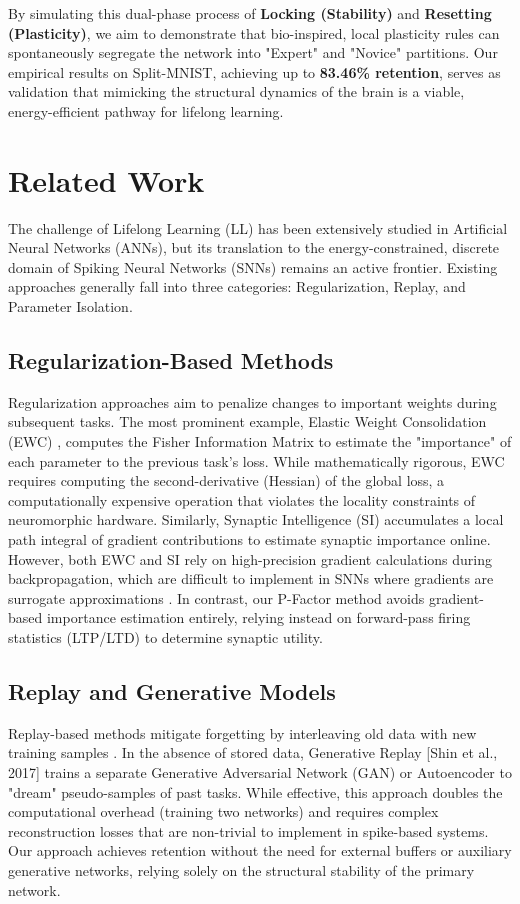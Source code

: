 \documentclass[5p,times]{elsarticle}
\begin{document}
By simulating this dual-phase process of \textbf{Locking (Stability)} and \textbf{Resetting (Plasticity)}, we aim to demonstrate that bio-inspired, local plasticity rules can spontaneously segregate the network into "Expert" and "Novice" partitions. Our empirical results on Split-MNIST, achieving up to \textbf{83.46\% retention}, serves as validation that mimicking the structural dynamics of the brain is a viable, energy-efficient pathway for lifelong learning.

\section{Related Work}
The challenge of Lifelong Learning (LL) has been extensively studied in Artificial Neural Networks (ANNs), but its translation to the energy-constrained, discrete domain of Spiking Neural Networks (SNNs) remains an active frontier. Existing approaches generally fall into three categories: Regularization, Replay, and Parameter Isolation.

\subsection{Regularization-Based Methods} Regularization approaches aim to penalize changes to important weights during subsequent tasks. The most prominent example, Elastic Weight Consolidation (EWC) \cite{Kirkpatrick2017}, computes the Fisher Information Matrix to estimate the "importance" of each parameter to the previous task's loss. While mathematically rigorous, EWC requires computing the second-derivative (Hessian) of the global loss, a computationally expensive operation that violates the locality constraints of neuromorphic hardware. Similarly, Synaptic Intelligence (SI) \cite{Zenke2017} accumulates a local path integral of gradient contributions to estimate synaptic importance online. However, both EWC and SI rely on high-precision gradient calculations during backpropagation, which are difficult to implement in SNNs where gradients are surrogate approximations \cite{Neftci2019}. In contrast, our P-Factor method avoids gradient-based importance estimation entirely, relying instead on forward-pass firing statistics (LTP/LTD) to determine synaptic utility.

\subsection{Replay and Generative Models} Replay-based methods mitigate forgetting by interleaving old data with new training samples \cite{Rebuffi2017}. In the absence of stored data, Generative Replay [Shin et al., 2017] trains a separate Generative Adversarial Network (GAN) or Autoencoder to "dream" pseudo-samples of past tasks. While effective, this approach doubles the computational overhead (training two networks) and requires complex reconstruction losses that are non-trivial to implement in spike-based systems. Our approach achieves retention without the need for external buffers or auxiliary generative networks, relying solely on the structural stability of the primary network.
\end{document}
